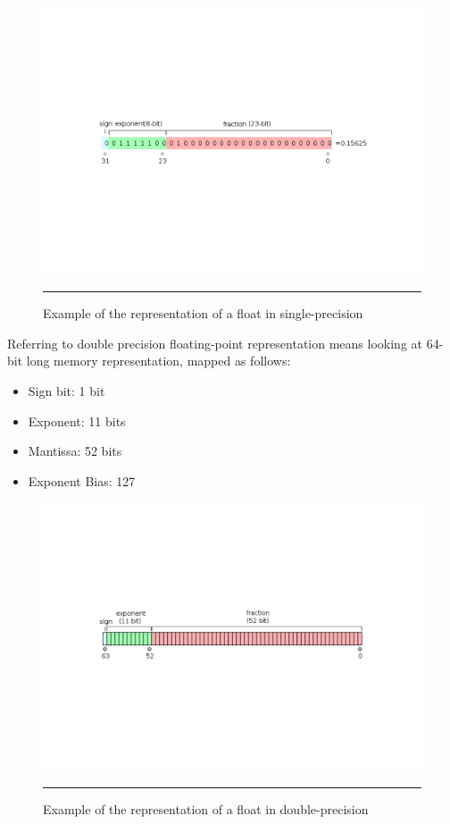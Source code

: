 \begin{figure}[htbp]
	\centering
		\includegraphics{Figures/SPFP.pdf}
		\rule{35em}{0.5pt}
	\caption[Single-precision float representation]{Example of the representation of a float in single-precision}
	\label{fig:SPFP}
\end{figure}

Referring to double precision floating-point representation means looking at 64-bit long memory representation, mapped as follows:
\begin{itemize}
  \item Sign bit: 1 bit
  \item Exponent: 11 bits
  \item Mantissa: 52 bits
  \item Exponent Bias: 127
\end{itemize}

\begin{figure}[htbp]
	\centering
		\includegraphics{Figures/DPFP.pdf}
		\rule{35em}{0.5pt}
	\caption[Double-precision float representation]{Example of the representation of a float in double-precision}
	\label{fig:DPFP}
\end{figure}

